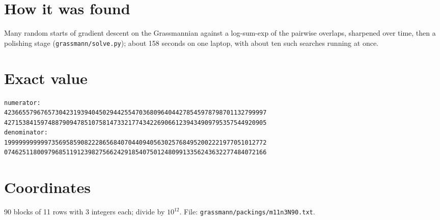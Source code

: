 \documentclass[11pt,a4paper]{article}
\begin{document}
\section{How it was found}
Many random starts of gradient descent on the Grassmannian against a log-sum-exp of the pairwise overlaps, sharpened over time, then a polishing stage (\texttt{grassmann/solve.py}); about 158 seconds on one laptop, with about ten such searches running at once.


\appendix
\section{Exact value}
{\small
\begin{verbatim}
numerator:
423665579676573042319394045029442554703680964044278545978798701132799997
427153841597488790947851075814733217743422690661239434909795357544920905
denominator:
199999999999735695859082228656840704409405630257684952002221977051012772
074625118009796851191239827566242918540750124809913356243632277484072166
\end{verbatim}}

\section{Coordinates}
90 blocks of 11 rows with 3 integers each; divide by $10^{12}$. File: \texttt{grassmann/packings/m11n3N90.txt}.
{\tiny
\begin{multicols}{3}
\end{multicols}}
\end{document}
